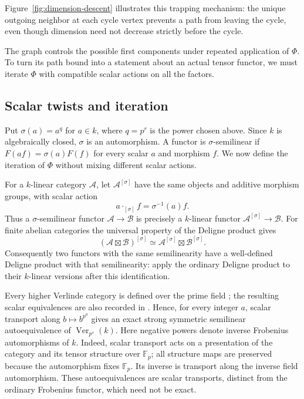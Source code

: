 Figure~\ref{fig:dimension-descent} illustrates this trapping mechanism:
the unique outgoing neighbor at each cycle vertex prevents a path from
leaving the cycle, even though dimension need not decrease strictly
before the cycle.


The graph controls the possible first components under repeated
application of \(\Phi\). To turn its path bound into a statement about
an actual tensor functor, we must iterate \(\Phi\) with compatible
scalar actions on all the factors.


\subsection{Scalar twists and iteration}
\label{subsec:scalar-iteration}
Put $\sigma(a)=a^q$ for $a\in k$, where $q=p^r$ is the power
chosen above.  Since $k$ is algebraically closed, $\sigma$ is an
automorphism.  A functor is $\sigma$-semilinear if
$F(af)=\sigma(a)F(f)$ for every scalar $a$ and morphism $f$.
We now define the iteration of $\Phi$ without mixing different
scalar actions.

For a $k$-linear category $\mathcal A$, let $\mathcal A^{[\sigma]}$
have the same objects and additive morphism groups, with scalar action
\[
 a\mathbin{\cdot_{[\sigma]}}f=\sigma^{-1}(a)f.
\]
Thus a $\sigma$-semilinear functor $\mathcal A\to\mathcal B$ is
precisely a $k$-linear functor $\mathcal A^{[\sigma]}\to\mathcal B$.
For finite abelian categories the universal property of the Deligne
product gives
\[
 (\mathcal A\boxtimes\mathcal B)^{[\sigma]}
 \simeq\mathcal A^{[\sigma]}\boxtimes\mathcal B^{[\sigma]}.
\]
Consequently two functors with the same semilinearity have a well-defined
Deligne product with that semilinearity: apply the ordinary Deligne
product to their $k$-linear versions after this identification.

Every higher Verlinde category is defined over the prime field
\cite[Section~4.9]{BEO2023}; the resulting scalar equivalences are also
recorded in \cite[Remark~2.3.8]{CoulembierFlakeHigher}.
Hence, for every integer $a$,
scalar transport along $b\mapsto b^{p^a}$ gives an exact strong symmetric
semilinear autoequivalence of $\operatorname{Ver}_{p^s}(k)$.
Here negative powers denote inverse Frobenius automorphisms of $k$.
Indeed, scalar transport acts on a presentation of the category and
its tensor structure over $\mathbb F_p$; all structure maps are
preserved because the automorphism fixes $\mathbb F_p$.
Its inverse is transport along the inverse field automorphism.
These autoequivalences are scalar transports, distinct from the ordinary
Frobenius functor, which need not be exact.

